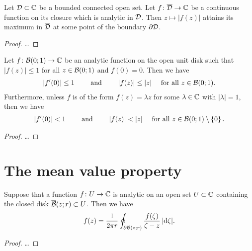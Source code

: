 \begin{corollary}
  \label{cor:maximum_modulus_on_boundary}
  Let $\Domain \subset \bC$ be a bounded connected open set.
  Let $f \colon \closOf{\Domain} \to \bC$ be a continuous function
  on its closure which is analytic in $\Domain$.
  Then $z \mapsto |f(z)|$ attains its maximum in $\closOf{\Domain}$
  at some point of the boundary $\bdry \Domain$.
\end{corollary}
\begin{proof}
  \ldots
\end{proof}

\begin{lemma}
  \label{lem:schwarz_lemma}
  Let $f \colon \DiskRC{1}{0} \to \bC$ be an analytic function
  on the open unit disk such that $|f(z)| \le 1$
  for all $z \in \DiskRC{1}{0}$ and $f(0) = 0$.
  Then we have
  \begin{align*}
    |f'(0)| \le 1
    \qquad \text{ and } \qquad
    |f(z)| \le |z| \quad \text{ for all } z \in \DiskRC{1}{0} .
  \end{align*}
  Furthermore, unless $f$ is of the form $f(z) = \lambda z$ for
  some $\lambda \in \bC$ with $|\lambda| = 1$, then we have
  \begin{align*}
    |f'(0)| < 1
    \qquad \text{ and } \qquad
    |f(z)| < |z| \quad \text{ for all } z \in \DiskRC{1}{0} \setminus \set{0}.
  \end{align*}
\end{lemma}
\begin{proof}
  \ldots
\end{proof}



\section{The mean value property}

\begin{theorem}
  \label{thm:mean_value_property}
  Suppose that a function $f \colon U \to \bC$ is analytic on an open
  set $U \subset \bC$ containing the closed disk $\CDiskRC{r}{z} \subset U$.
  Then we have
  \begin{align*}
    f(z) = \frac{1}{2 \pi r} \oint_{\bdry \DiskRC{r}{z}}
            \frac{f(\zeta)}{\zeta - z} \, |\ud \zeta| .
  \end{align*}
\end{theorem}
\begin{proof}
  \ldots
\end{proof}

